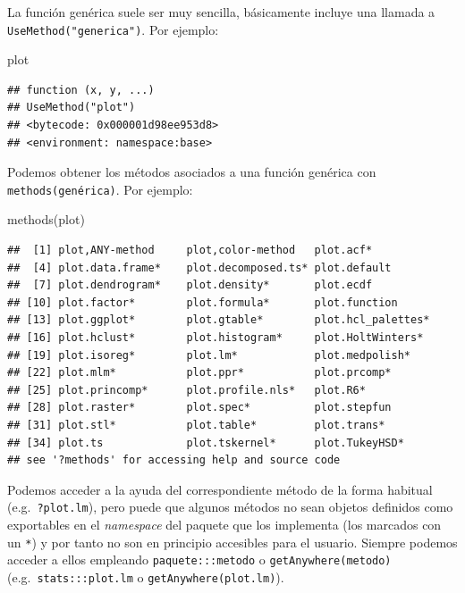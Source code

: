 \documentclass[
]{book}
\newenvironment{Shaded}{\begin{snugshade}}{\end{snugshade}}
\newcommand{\FunctionTok}[1]{\textcolor[rgb]{0.00,0.00,0.00}{#1}}
\newcommand{\NormalTok}[1]{#1}
\theoremstyle{break}
\theoremstyle{nonumberplain}
\begin{document}
La función genérica suele ser muy sencilla, básicamente incluye una llamada a \texttt{UseMethod("generica")}.
Por ejemplo:

\begin{Shaded}
\begin{Highlighting}[]
\NormalTok{plot}
\end{Highlighting}
\end{Shaded}

\begin{verbatim}
## function (x, y, ...) 
## UseMethod("plot")
## <bytecode: 0x000001d98ee953d8>
## <environment: namespace:base>
\end{verbatim}

Podemos obtener los métodos asociados a una función genérica con \texttt{methods(genérica)}.
Por ejemplo:

\begin{Shaded}
\begin{Highlighting}[]
\FunctionTok{methods}\NormalTok{(plot)}
\end{Highlighting}
\end{Shaded}

\begin{verbatim}
##  [1] plot,ANY-method     plot,color-method   plot.acf*          
##  [4] plot.data.frame*    plot.decomposed.ts* plot.default       
##  [7] plot.dendrogram*    plot.density*       plot.ecdf          
## [10] plot.factor*        plot.formula*       plot.function      
## [13] plot.ggplot*        plot.gtable*        plot.hcl_palettes* 
## [16] plot.hclust*        plot.histogram*     plot.HoltWinters*  
## [19] plot.isoreg*        plot.lm*            plot.medpolish*    
## [22] plot.mlm*           plot.ppr*           plot.prcomp*       
## [25] plot.princomp*      plot.profile.nls*   plot.R6*           
## [28] plot.raster*        plot.spec*          plot.stepfun       
## [31] plot.stl*           plot.table*         plot.trans*        
## [34] plot.ts             plot.tskernel*      plot.TukeyHSD*     
## see '?methods' for accessing help and source code
\end{verbatim}

Podemos acceder a la ayuda del correspondiente método de la forma habitual (e.g.~\texttt{?plot.lm}), pero puede que algunos métodos no sean objetos definidos como exportables en el \emph{namespace} del paquete que los implementa (los marcados con un \texttt{*}) y por tanto no son en principio accesibles para el usuario.
Siempre podemos acceder a ellos empleando \texttt{paquete:::metodo} o \texttt{getAnywhere(metodo)} (e.g.~\texttt{stats:::plot.lm} o \texttt{getAnywhere(plot.lm)}).
\end{document}
